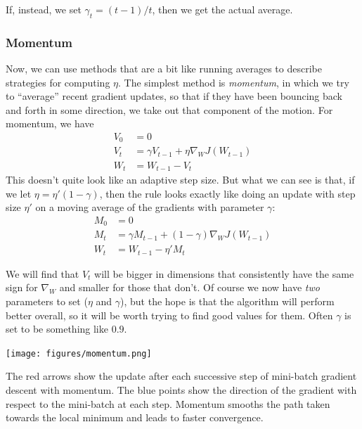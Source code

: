 If, instead, we set $\gamma_t = (t - 1)  / t$, then we get the actual
average.

\subsubsection{Momentum} 
Now, we can use methods that are a bit like running averages to
describe strategies for computing $\eta$.
The simplest method is {\em momentum}, in  which we try to ``average'' recent
gradient updates,  so that if they have been bouncing back and forth
in some direction, we take out that component of the motion.  For
momentum, we have
\begin{align*}
V_0 & = 0 \\
V_t & = \gamma V_{t-1} + \eta \nabla_W J(W_{t-1}) \\
W_t & = W_{t-1} - V_t
\end{align*}
This doesn't quite look like an adaptive step size.  But what we can
see is that, if we let $\eta = \eta'(1 - \gamma)$, then the rule looks exactly like doing an update with
step size $\eta'$ on a moving average of the gradients with parameter
$\gamma$:
\begin{align*}
M_0 & = 0 \\
M_t & = \gamma M_{t-1} + (1 - \gamma) \nabla_W J(W_{t-1}) \\
W_t & = W_{t-1} - \eta' M_t
\end{align*}


We will find that $V_t$ will be bigger in dimensions that consistently
have the same sign for $\nabla_{W}$ and smaller for those that
don't.   Of course we now have {\em two}  parameters  to set ($\eta$
and $\gamma$), but the
hope is  that the algorithm will perform better overall, so it will be
worth trying to find good values for them.  Often $\gamma$ is  set to
be something like $0.9$.  
\begin{examplebox}
\begin{center}
\texttt{[image: figures/momentum.png]}
\end{center}
The red arrows show the update after each successive step of
mini-batch gradient descent with momentum.  The blue points show the
direction of the gradient with respect to the mini-batch at each step.
Momentum smooths the path taken towards the local minimum and leads to
faster convergence.
\end{examplebox}

